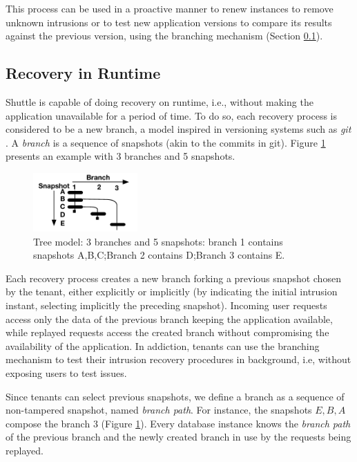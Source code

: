 This process can be used in a proactive manner to renew instances to remove unknown intrusions \cite{Sousa2010} or to test new application versions to compare its results against the previous version, using the branching mechanism (Section \ref{sec:recovery:runtime_recovery}).


\subsection{Recovery in Runtime}
\label{sec:recovery:runtime_recovery}
Shuttle is capable of doing recovery on runtime, i.e., without making the application unavailable for a period of time. To do so, each recovery process is considered to be a new branch, a model inspired in versioning systems such as \emph{git} \cite{git}. A \emph{branch} is a sequence of snapshots (akin to the commits in git). Figure \ref{fig:branches} presents an example with 3 branches and 5 snapshots.

\begin{figure}
  \centering
  \includegraphics[width=40mm]{images/branches}
  \caption{\footnotesize{Tree model:} 3 branches and 5 snapshots: branch 1 contains snapshots A,B,C;\newline Branch 2 contains D;\newline Branch 3 contains E.}
  \label{fig:branches}
\end{figure}

Each recovery process creates a new branch forking a previous snapshot chosen by the tenant, either explicitly or implicitly (by indicating the initial intrusion instant, selecting implicitly the preceding snapshot). Incoming user requests access only the data of the previous branch keeping the application available, while replayed requests access the created branch without compromising the availability of the application. In addiction, tenants can use the branching mechanism to test their intrusion recovery procedures in background, i.e, without exposing users to test issues.

Since tenants can select previous snapshots, we define a branch as a sequence of non-tampered snapshot, named \emph{branch path}. For instance, the snapshots $E, B, A$ compose the branch 3 (Figure \ref{fig:branches}). Every database instance knows the \emph{branch path} of the previous branch and the newly created branch in use by the requests being replayed.


